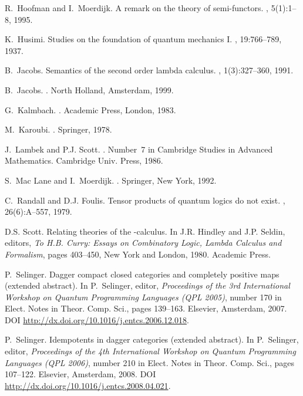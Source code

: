 \documentclass{article}
\begin{document}
\begin{thebibliography}{10}
R.~Hoofman and I.~Moerdijk.
\newblock A remark on the theory of semi-functors.
, 5(1):1--8, 1995.

K.~Husimi.
\newblock Studies on the foundation of quantum mechanics {I}.
, 19:766--789, 1937.

B.~Jacobs.
\newblock Semantics of the second order lambda calculus.
, 1(3):327--360, 1991.

B.~Jacobs.
.
\newblock North Holland, Amsterdam, 1999.

G.~Kalmbach.
.
\newblock Academic Press, London, 1983.

M.~Karoubi.
.
\newblock Springer, 1978.

J.~Lambek and P.J. Scott.
.
\newblock Number~7 in Cambridge Studies in Advanced Mathematics. Cambridge
  Univ. Press, 1986.

S.~Mac Lane and I.~Moerdijk.
.
\newblock Springer, New York, 1992.

C.~Randall and D.J. Foulis.
\newblock Tensor products of quantum logics do not exist.
, 26(6):A--557, 1979.

D.S. Scott.
\newblock Relating theories of the -calculus.
\newblock In J.R. Hindley and J.P. Seldin, editors, {\em To H.B. Curry: Essays
  on Combinatory Logic, Lambda Calculus and Formalism}, pages 403--450, New
  York and London, 1980. Academic Press.

P.~Selinger.
\newblock Dagger compact closed categories and completely positive maps
  (extended abstract).
\newblock In P.~Selinger, editor, {\em Proceedings of the 3rd International
  Workshop on Quantum Programming Languages (QPL 2005)}, number 170 in Elect.
  Notes in Theor. Comp. Sci., pages 139--163. Elsevier, Amsterdam, 2007.
\newblock DOI \url{http://dx.doi.org/10.1016/j.entcs.2006.12.018}.

P.~Selinger.
\newblock Idempotents in dagger categories (extended abstract).
\newblock In P.~Selinger, editor, {\em Proceedings of the 4th International
  Workshop on Quantum Programming Languages (QPL 2006)}, number 210 in Elect.
  Notes in Theor. Comp. Sci., pages 107--122. Elsevier, Amsterdam, 2008.
\newblock DOI \url{http://dx.doi.org/10.1016/j.entcs.2008.04.021}.

\end{thebibliography}
\end{document}
